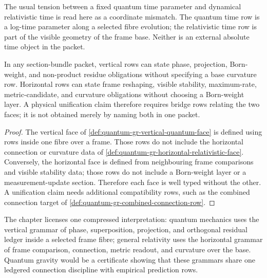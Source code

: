 \begin{principle}
\label{prin:quantum-gr-time-conflict-bundle-coordinate-problem}
The usual tension between a fixed quantum time parameter and dynamical
relativistic time is read here as a coordinate mismatch. The quantum time
row is a log-time parameter along a selected fibre evolution; the
relativistic time row is part of the visible geometry of the frame base.
Neither is an external absolute time object in the packet.
\end{principle}

\begin{theorem}
\label{thm:quantum-gr-section-bundle-role-separation}
In any section-bundle packet, vertical rows can state phase, projection,
Born-weight, and non-product residue obligations without specifying a
base curvature row. Horizontal rows can state frame reshaping, visible
stability, maximum-rate, metric-candidate, and curvature obligations
without choosing a Born-weight layer. A physical unification claim
therefore requires bridge rows relating the two faces; it is not
obtained merely by naming both in one packet.
\end{theorem}

\begin{proof}
The vertical face of
\autoref{def:quantum-gr-vertical-quantum-face} is defined using rows
inside one fibre over a frame. Those rows do not include the horizontal
connection or curvature data of
\autoref{def:quantum-gr-horizontal-relativistic-face}. Conversely, the
horizontal face is defined from neighbouring frame comparisons and visible
stability data; those rows do not include a Born-weight layer or a
measurement-update section. Therefore each face is well typed without the
other. A unification claim needs additional compatibility rows, such as
the combined connection target of
\autoref{def:quantum-gr-combined-connection-row}.
\end{proof}

\begin{principle}
\label{prin:quantum-gr-section-bundle-boundary-status}
The chapter licenses one compressed interpretation: quantum mechanics
uses the vertical grammar of phase, superposition, projection, and
orthogonal residual ledger inside a selected frame fibre; general
relativity uses the horizontal grammar of frame comparison, connection,
metric readout, and curvature over the base. Quantum gravity would be a
certificate showing that these grammars share one ledgered connection
discipline with empirical prediction rows.
\end{principle}
